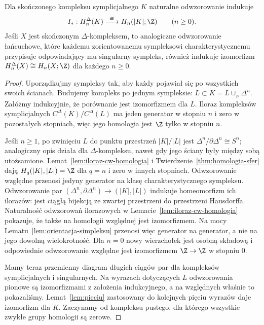 \begin{twierdzenie}
\label{thm:symplicjalna-singularna}
Dla skończonego kompleksu symplicjalnego
$K$ naturalne odwzorowanie indukuje
\[
 I_*:H_n^\Delta(K)\xrightarrow{\ \cong\ }
 H_n(|K|;\Z)
 \qquad(n\geq0).
\]
Jeśli $X$ jest skończonym $\Delta$-kompleksem,
to analogiczne odwzorowanie łańcuchowe,
które każdemu zorientowanemu sympleksowi
charakterystycznemu przypisuje odpowiadający
mu singularny sympleks, również indukuje
izomorfizm
$H_n^\Delta(X)\cong H_n(X;\Z)$
dla każdego $n\geq0$.
\end{twierdzenie}
\begin{proof}
Uporządkujmy sympleksy tak, aby
każdy pojawiał się po wszystkich
swoich ścianach. Budujemy kompleks
po jednym sympleksie:
$L\subset K=L\cup_\varphi\Delta^n$.
Załóżmy indukcyjnie, że porównanie
jest izomorfizmem dla $L$.
Iloraz kompleksów symplicjalnych
$C^\Delta(K)/C^\Delta(L)$
ma jeden generator w stopniu $n$
i zero w pozostałych stopniach,
więc jego homologia jest $\Z$
tylko w stopniu $n$.

Jeśli $n\geq1$, po zwinięciu $L$
do punktu przestrzeń $|K|/|L|$
jest $\Delta^n/\partial\Delta^n
\cong S^n$; analogiczny opis
działa dla $\Delta$-kompleksu,
nawet gdy jego ściany były
między sobą utożsamione.
Lemat~\ref{lem:iloraz-cw-homologia}
i Twierdzenie~\ref{thm:homologia-sfer}
dają $H_q(|K|,|L|)=\Z$ dla
$q=n$ i zero w innych stopniach.
Odwzorowanie względne przenosi jedyny
generator na klasę charakterystycznego sympleksu.
Odwzorowanie par $(\Delta^n,\partial\Delta^n)\to(|K|,|L|)$
indukuje homeomorfizm ich ilorazów: jest ciągłą bijekcją
ze zwartej przestrzeni do przestrzeni Hausdorffa.
Naturalność odwzorowań ilorazowych w Lemacie~\ref{lem:iloraz-cw-homologia}
pokazuje, że także na homologii względnej jest izomorfizmem.
Na mocy Lematu~\ref{lem:orientacja-simpleksu} przenosi więc
generator na generator, a nie na jego dowolną wielokrotność.
Dla $n=0$ nowy wierzchołek jest
osobną składową i odpowiednie
odwzorowanie względne jest izomorfizmem
$\Z\to\Z$ w stopniu $0$.

Mamy teraz przemienny diagram
długich ciągów par dla kompleksów
symplicjalnych i singularnych.
Na wyrazach dotyczących $L$
odwzorowania pionowe są izomorfizmami
z założenia indukcyjnego,
a na względnych właśnie
to pokazaliśmy. Lemat~\ref{lem:pieciu}
zastosowany do kolejnych pięciu
wyrazów daje izomorfizm dla $K$.
Zaczynamy od kompleksu pustego,
dla którego wszystkie zwykłe
grupy homologii są zerowe.
\end{proof}

